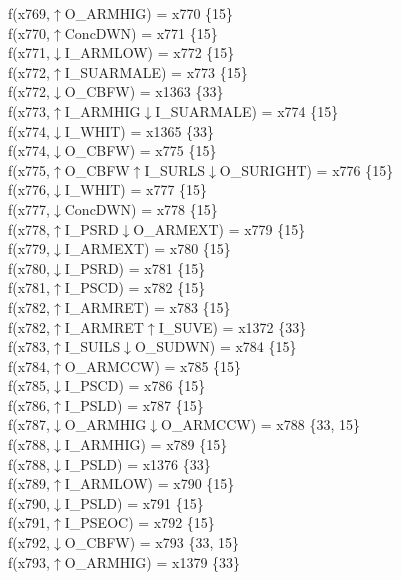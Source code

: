 f(x769,$\uparrow$O\_ARMHIG) = x770 \{15\} \\  
f(x770,$\uparrow$ConcDWN) = x771 \{15\} \\  
f(x771,$\downarrow$I\_ARMLOW) = x772 \{15\} \\  
f(x772,$\uparrow$I\_SUARMALE) = x773 \{15\} \\  
f(x772,$\downarrow$O\_CBFW) = x1363 \{33\} \\  
f(x773,$\uparrow$I\_ARMHIG$\downarrow$I\_SUARMALE) = x774 \{15\} \\  
f(x774,$\downarrow$I\_WHIT) = x1365 \{33\} \\  
f(x774,$\downarrow$O\_CBFW) = x775 \{15\} \\  
f(x775,$\uparrow$O\_CBFW$\uparrow$I\_SURLS$\downarrow$O\_SURIGHT) = x776 \{15\} \\  
f(x776,$\downarrow$I\_WHIT) = x777 \{15\} \\  
f(x777,$\downarrow$ConcDWN) = x778 \{15\} \\  
f(x778,$\uparrow$I\_PSRD$\downarrow$O\_ARMEXT) = x779 \{15\} \\  
f(x779,$\downarrow$I\_ARMEXT) = x780 \{15\} \\  
f(x780,$\downarrow$I\_PSRD) = x781 \{15\} \\  
f(x781,$\uparrow$I\_PSCD) = x782 \{15\} \\  
f(x782,$\uparrow$I\_ARMRET) = x783 \{15\} \\  
f(x782,$\uparrow$I\_ARMRET$\uparrow$I\_SUVE) = x1372 \{33\} \\  
f(x783,$\uparrow$I\_SUILS$\downarrow$O\_SUDWN) = x784 \{15\} \\  
f(x784,$\uparrow$O\_ARMCCW) = x785 \{15\} \\  
f(x785,$\downarrow$I\_PSCD) = x786 \{15\} \\  
f(x786,$\uparrow$I\_PSLD) = x787 \{15\} \\  
f(x787,$\downarrow$O\_ARMHIG$\downarrow$O\_ARMCCW) = x788 \{33, 15\} \\  
f(x788,$\downarrow$I\_ARMHIG) = x789 \{15\} \\  
f(x788,$\downarrow$I\_PSLD) = x1376 \{33\} \\  
f(x789,$\uparrow$I\_ARMLOW) = x790 \{15\} \\  
f(x790,$\downarrow$I\_PSLD) = x791 \{15\} \\  
f(x791,$\uparrow$I\_PSEOC) = x792 \{15\} \\  
f(x792,$\downarrow$O\_CBFW) = x793 \{33, 15\} \\  
f(x793,$\uparrow$O\_ARMHIG) = x1379 \{33\} \\  
